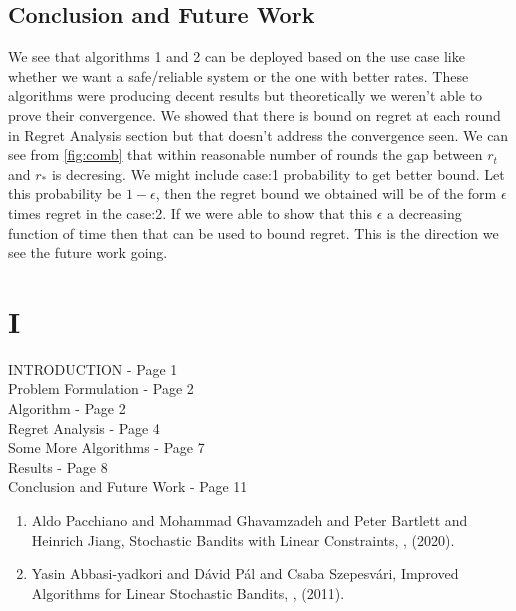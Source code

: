 \documentclass[BTech,thesis]{iitmdiss}
\begin{document}
\section{Conclusion and Future Work}
We see that algorithms 1 and 2 can be deployed based on the use case like whether we want a safe/reliable system or the one with better rates. These algorithms were producing decent results but theoretically we weren't able to prove their convergence. We showed that there is bound on regret at each round in Regret Analysis section but that doesn't address the convergence seen. We can see from \ref{fig:comb} that within reasonable number of rounds the gap between $r_t$ and $r_*$ is decresing. We might include case:1 probability to get better bound. Let this probability be $1-\epsilon$, then the regret bound we obtained will be of the form $\epsilon$ times regret in the case:2. If we were able to show that this $\epsilon$ a decreasing function of time then that can be used to bound regret. This is the direction we see the future work going. 


 \appendix
 
 \chapter{I}
 
 INTRODUCTION - Page 1 \\
 Problem Formulation - Page 2 \\
 Algorithm - Page 2 \\
 Regret Analysis - Page 4 \\
 Some More Algorithms - Page 7 \\
 Results - Page 8 \\
 Conclusion and Future Work - Page 11 \\
 



\listofpapers

\begin{enumerate}  
	\item Aldo Pacchiano and Mohammad Ghavamzadeh and Peter Bartlett and Heinrich Jiang, \newblock
	Stochastic Bandits with Linear Constraints,
	, (2020).
    \item Yasin Abbasi-yadkori and Dávid Pál and Csaba Szepesvári, \newblock
    Improved Algorithms for Linear Stochastic Bandits,
    , (2011).
\end{enumerate}  

\pagebreak
\begin{singlespace}
  \begin{small}
	
  \end{small}
\end{singlespace}
\end{document}
